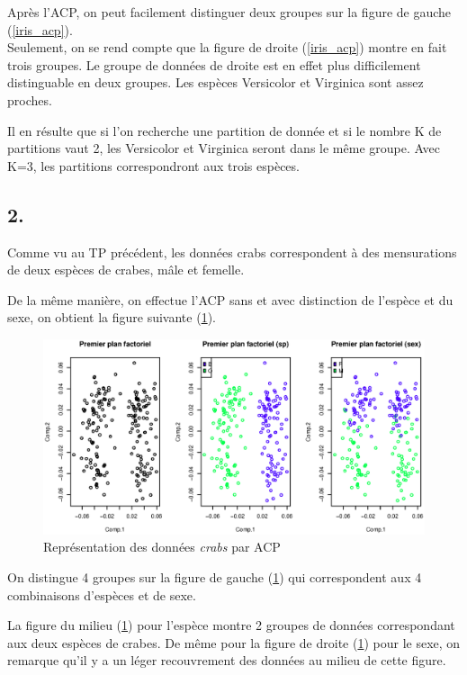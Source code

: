 \documentclass{article}
\begin{document}
Après l'ACP, on peut facilement distinguer deux groupes sur la figure de gauche (\ref{iris_acp}).\\
Seulement, on se rend compte que la figure de droite (\ref{iris_acp}) montre en fait trois groupes. Le groupe de données de droite est en effet plus difficilement distinguable en deux groupes. Les espèces Versicolor et Virginica sont assez proches.

Il en résulte que si l'on recherche une partition de donnée et si le nombre K de partitions vaut 2, les Versicolor et Virginica seront dans le même groupe. Avec K=3, les partitions correspondront aux trois espèces.

\subsection*{2.}

Comme vu au TP précédent, les données crabs correspondent à des mensurations de deux espèces de crabes, mâle et femelle.

De la même manière, on effectue l'ACP sans et avec distinction de l'espèce et du sexe, on obtient la figure suivante (\ref{crabs_acp}).
\begin{figure}[H]
\centering
\includegraphics[scale=0.55]{./img/crabs_acp.eps}
\caption{Représentation des données \textit{crabs} par ACP}
\label{crabs_acp}
\end{figure}

On distingue 4 groupes sur la figure de gauche (\ref{crabs_acp}) qui correspondent aux 4 combinaisons d'espèces et de sexe.

La figure du milieu (\ref{crabs_acp}) pour l'espèce montre 2 groupes de données correspondant aux deux espèces de crabes. De même pour la figure de droite (\ref{crabs_acp}) pour le sexe, on remarque qu'il y a un léger recouvrement des données au milieu de cette figure.
\end{document}
